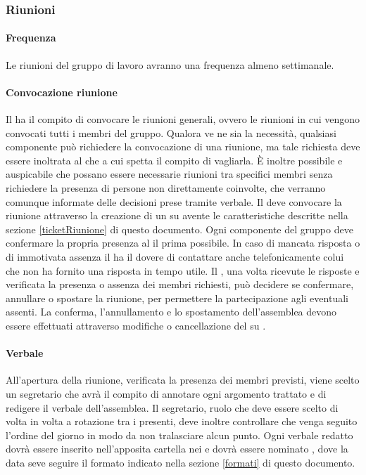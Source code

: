 \documentclass[12pt,a4paper]{article}
\begin{document}
\subsubsection{Riunioni}
\paragraph{Frequenza}
Le riunioni del gruppo di lavoro avranno una frequenza almeno settimanale.

\paragraph{Convocazione riunione}
Il \PM{} ha il compito di convocare le riunioni generali, ovvero le riunioni in cui vengono convocati tutti i membri del gruppo.
Qualora ve ne sia la necessità, qualsiasi componente può richiedere la convocazione di una riunione, ma tale richiesta deve essere inoltrata al \PM{} che a cui spetta il compito di vagliarla. È inoltre possibile e auspicabile che possano essere necessarie riunioni tra specifici membri senza richiedere la presenza di persone non direttamente coinvolte, che verranno comunque informate delle decisioni prese tramite verbale.
Il \PM{} deve convocare la riunione attraverso la creazione di un \textit{} su \textit{} avente le caratteristiche descritte nella sezione \ref{ticketRiunione} di questo documento.
Ogni componente del gruppo deve confermare la propria presenza al \PM{} il prima possibile. 
In caso di mancata risposta o di immotivata assenza il \PM{} ha il dovere di contattare anche telefonicamente colui che non ha fornito una risposta in tempo utile. Il \PM{}, una volta ricevute le risposte e verificata la presenza o assenza dei membri richiesti, può decidere se confermare, annullare o spostare la riunione, per permettere la partecipazione agli eventuali assenti. La conferma, l'annullamento e lo spostamento dell'assemblea devono essere effettuati attraverso modifiche o cancellazione del  su \textit{}.

\paragraph{Verbale}
All'apertura della riunione, verificata la presenza dei membri previsti, viene scelto un segretario che avrà il compito di annotare ogni argomento trattato e di redigere il verbale dell'assemblea.
Il segretario, ruolo che deve essere scelto di volta in volta a rotazione tra i presenti, deve inoltre controllare che venga seguito l'ordine del giorno in modo da non tralasciare alcun punto.
Ogni verbale redatto dovrà essere inserito nell'apposita cartella  nei \textit{} e dovrà essere nominato , dove la data seve seguire il formato indicato nella sezione \ref{formati} di questo documento.
\end{document}
